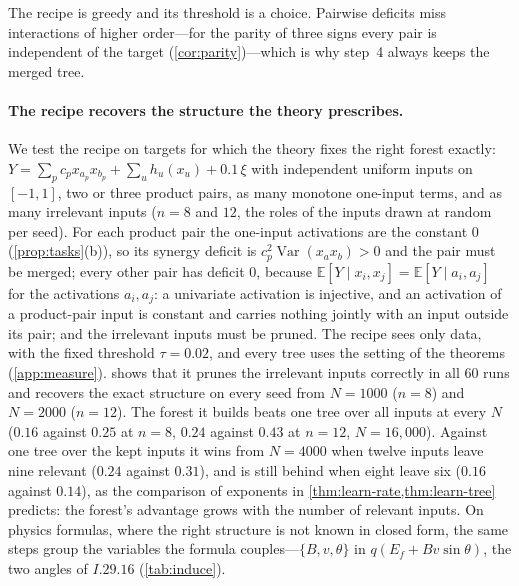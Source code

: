 \documentclass[11pt]{article}
\theoremstyle{definition}
\theoremstyle{remark}
\newcommand{\E}{\mathbb{E}}
\newcommand{\Var}{\operatorname{Var}}
\begin{document}
The recipe is greedy and its threshold is a choice.  Pairwise deficits miss interactions of
higher order---for the parity of three signs every pair is independent of the target
(\cref{cor:parity})---which is why step~4 always keeps the merged tree.  

\paragraph{The recipe recovers the structure the theory prescribes.}
We test the recipe on targets for which the theory fixes the right forest exactly:
$Y=\sum_pc_px_{a_p}x_{b_p}+\sum_uh_u(x_u)+0.1\,\xi$ with independent uniform inputs on $[-1,1]$, two or
three product pairs, as many monotone one-input terms, and as many irrelevant inputs ($n=8$
and $12$, the roles of the inputs drawn at random per seed).  For each product pair the
one-input activations are the constant $0$ (\cref{prop:tasks}(b)), so its synergy deficit is
$c_p^2\Var(x_ax_b)>0$ and the pair must be merged; every other pair has deficit $0$, because
$\E[Y\mid x_i,x_j]=\E[Y\mid a_i,a_j]$ for the activations $a_i,a_j$: a univariate activation is
injective, and an activation of a product-pair input is constant and carries nothing jointly
with an input outside its pair; and the irrelevant inputs
must be pruned.  The recipe sees only data, with the fixed threshold $\tau=0.02$, and every tree
uses the setting of the theorems (\cref{app:measure}).   shows that it prunes the
irrelevant inputs correctly in all $60$ runs and recovers the exact structure on every seed
from $N=1000$ ($n=8$) and $N=2000$ ($n=12$).  The forest it builds beats one tree over all
inputs at every $N$ ($0.16$ against $0.25$ at $n=8$, $0.24$ against $0.43$ at $n=12$, $N=16{,}000$).
Against one tree over the kept inputs it wins from $N=4000$ when twelve inputs leave nine
relevant ($0.24$ against $0.31$), and is still behind when eight leave six ($0.16$ against $0.14$),
as the comparison of exponents in \cref{thm:learn-rate,thm:learn-tree} predicts: the forest's
advantage grows with the number of relevant inputs.  On physics formulas, where the right
structure is not known in closed form, the same steps group the variables the formula
couples---$\{B,v,\theta\}$ in $q(E_f+Bv\sin\theta)$, the two angles of $I.29.16$
(\cref{tab:induce}).

\begin{table}[t]
\centering\small
{}
\caption{The recipe on targets with a known right structure (five seeds per row).
``recovered'': runs in which the merged groups and the pruned inputs are exactly the
prescribed ones; ``pruned'': runs with exactly the irrelevant inputs pruned.  Test
RMSE$/\mathrm{sd}(f)$ of one tree over all inputs, one tree over the kept inputs, and the
recipe's forest.}
\label{tab:recipe}
\end{table}
\end{document}
